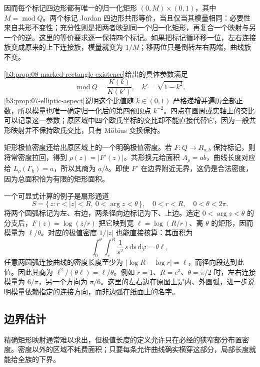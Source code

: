 因而每个标记四边形都有唯一的归一化矩形 \((0,M)\times(0,1)\)，其中 \(M=\operatorname{mod}Q\)。两个标记 Jordan 四边形共形等价，当且仅当其模量相同：必要性来自共形不变性；充分性则是把两者映到同一个归一化矩形，再复合一个映射与另一个的逆。这里的等价要求逐一保持四个标记。如果把标记循环移一位，左右连接族变成原来的上下连接族，模量就变为 \(1/M\)；移两位只是倒转左右两端，曲线族不变。

\ProseParagraphBreak
\cref{b3:prop:08-marked-rectangle-existence}给出的具体参数满足
\[
 \operatorname{mod}Q=\frac{K(k)}{K(k')},\quad k'=\sqrt{1-k^2}.
\]
\cref{b3:prop:07-elliptic-aspect}说明这个比值随 \(k\in(0,1)\) 严格递增并遍历全部正数，所以模量也唯一确定归一化后的第四预顶点 \(k^{-2}\)。四点在圆周或实轴上的交比可以记录这一参数；原区域中四个欧氏坐标的交比却不能直接代替它，因为一般共形映射并不保持欧氏交比，只有 Möbius 变换保持。

\ProseParagraphBreak
矩形极值密度还给出原区域上的一个明确极值密度。若 \(F:Q\rightarrow R_{a,b}\) 保持标记，则将常密度拉回，得到 \(\rho(z)=|F'(z)|\)。共形换元给面积 \(A_\rho=ab\)，曲线长度对应给 \(L_\rho(\Gamma_{\mathrm h})=a\)，所以其商为 \(a/b\)。即使 \(F'\) 在边界附近无界，这仍是合法密度，因为总面积恰为有限的矩形面积。

\ProseParagraphBreak
一个可显式计算的例子是扇形通道
\[
 S=\{\,z:r<|z|<R,\ 0<\arg z<\theta\,\},\quad
 0<r<R,\quad0<\theta<2\pi.
\]
将两个圆弧标记为左、右边，两条径向边标记为下、上边。选定 \(0<\arg z<\theta\) 的分支后，\(F(z)=\log(z/r)\) 把它映到宽 \(\ell=\log(R/r)\)、高 \(\theta\) 的矩形，因而模量为 \(\ell/\theta\)。对应的极值密度 \(1/|z|\) 也能直接核算：其面积为
\[
 \int_0^\theta\int_r^R\frac1{s^2}\,s\,\mathrm ds\,\mathrm d\varphi
 =\theta\ell,
\]
任意两圆弧连接曲线的密度长度至少为 \(|\log R-\log r|=\ell\)，而径向段达到此值。因此其商为 \(\ell^2/(\theta\ell)=\ell/\theta\)。例如 \(r=1\)、\(R=e^3\)、\(\theta=\pi/2\) 时，左右连接模量为 \(6/\pi\)，另一个方向为 \(\pi/6\)。这里的左右边在原图上是内、外圆弧，进一步说明模量依赖指定的连接方向，而非边弧在纸面上的名字。

\subsection{边界估计}
\label{b3:subsec:080404}

精确矩形映射通常难以求出，但极值长度的定义允许只在必经的狭窄部分布置密度。密度以外的区域不耗费面积；只要每条允许曲线确实横穿这部分，局部长度就能给全族的下界。

